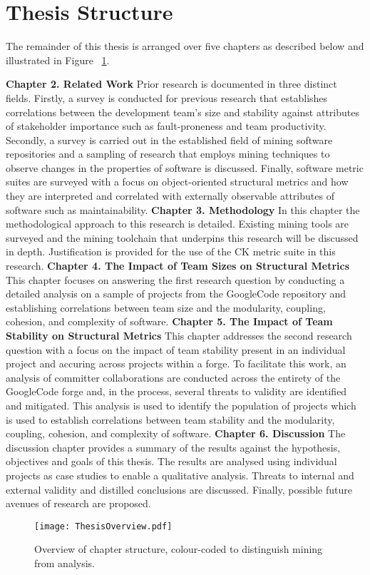 \section{Thesis Structure} %
The remainder of this thesis is arranged over five chapters as described below and illustrated in Figure ~\ref{fig:ThesisOverview}.

\textbf{Chapter 2. Related Work} Prior research is documented in three distinct fields. Firstly, a survey is conducted for previous research that establishes correlations between the development team's size and stability against attributes of stakeholder importance such as fault-proneness and team productivity. Secondly, a survey is carried out in the established field of mining software repositories and a sampling of research that employs mining techniques to observe changes in the properties of software is discussed. Finally, software metric suites are surveyed with a focus on object-oriented structural metrics and how they are interpreted and correlated with externally observable attributes of software such as maintainability.
\newline
\newline
\textbf{Chapter 3. Methodology} In this chapter the methodological approach to this research is detailed. Existing mining tools are surveyed and the mining toolchain that underpins this research will be discussed in depth. Justification is provided for the use of the CK metric suite in this research. 
\newline
\newline
\textbf{Chapter 4. The Impact of Team Sizes on Structural Metrics} This chapter focuses on answering the first research question by conducting a detailed analysis on a sample of projects from the GoogleCode repository and establishing correlations between team size and the modularity, coupling, cohesion, and complexity of software.
\newline
\newline
\textbf{Chapter 5. The Impact of Team Stability on Structural Metrics} This chapter addresses the second research question with a focus on the impact of team stability present in an individual project and accuring across projects within a forge. To facilitate this work, an analysis of committer collaborations are conducted across the entirety of the GoogleCode forge and, in the process, several threats to validity are identified and mitigated. This analysis is used to identify the population of projects which is used to establish correlations between team stability and the modularity, coupling, cohesion, and complexity of software.
\newline
\newline
\textbf{Chapter 6. Discussion} The discussion chapter provides a summary of the results against the hypothesis, objectives and goals of this thesis. The results are analysed using individual projects as case studies to enable a qualitative analysis. Threats to internal and external validity and distilled conclusions are discussed. Finally, possible future avenues of research are proposed.

\begin{landscape}
\begin{figure}[htbp!] 
\centering    
\texttt{[image: ThesisOverview.pdf]}
\caption[Thesis overview.]{Overview of chapter structure, colour-coded to distinguish mining from analysis.}
\label{fig:ThesisOverview}
\end{figure}
\end{landscape}
